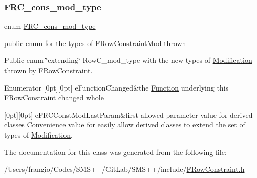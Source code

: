 \subsubsection{\texorpdfstring{F\+R\+C\+\_\+cons\+\_\+mod\+\_\+type}{FRC\_cons\_mod\_type}}
{\footnotesize\ttfamily enum \mbox{\hyperlink{class_s_m_spp__di__unipi__it_1_1_f_row_constraint_mod_af140985c04c8a274ecc353a0eee2debb}{F\+R\+C\+\_\+cons\+\_\+mod\+\_\+type}}}



public enum for the types of \mbox{\hyperlink{class_s_m_spp__di__unipi__it_1_1_f_row_constraint_mod}{F\+Row\+Constraint\+Mod}} thrown 

Public enum \char`\"{}extending\char`\"{} Row\+C\+\_\+mod\+\_\+type with the new types of \mbox{\hyperlink{class_s_m_spp__di__unipi__it_1_1_modification}{Modification}} thrown by \mbox{\hyperlink{class_s_m_spp__di__unipi__it_1_1_f_row_constraint}{F\+Row\+Constraint}}. \begin{DoxyEnumFields}{Enumerator}
[0pt][0pt]{}\mbox{\label{class_s_m_spp__di__unipi__it_1_1_f_row_constraint_mod_af140985c04c8a274ecc353a0eee2debba2d56f392a43ca0db9b27247c7d60b944}} 
e\+Function\+Changed&the \mbox{\hyperlink{class_s_m_spp__di__unipi__it_1_1_function}{Function}} underlying this \mbox{\hyperlink{class_s_m_spp__di__unipi__it_1_1_f_row_constraint}{F\+Row\+Constraint}} changed whole \\
\hline

[0pt][0pt]{}\mbox{\label{class_s_m_spp__di__unipi__it_1_1_f_row_constraint_mod_af140985c04c8a274ecc353a0eee2debba8eb391333acd3ae33af997eeccb2e763}} 
e\+F\+R\+C\+Const\+Mod\+Last\+Param&first allowed parameter value for derived classes Convenience value for easily allow derived classes to extend the set of types of \mbox{\hyperlink{class_s_m_spp__di__unipi__it_1_1_modification}{Modification}}. \\
\hline

\end{DoxyEnumFields}


The documentation for this class was generated from the following file\+:\begin{DoxyCompactItemize}
\item 
/\+Users/frangio/\+Codes/\+S\+M\+S++/\+Git\+Lab/\+S\+M\+S++/include/\mbox{\hyperlink{_f_row_constraint_8h}{F\+Row\+Constraint.\+h}}\end{DoxyCompactItemize}
